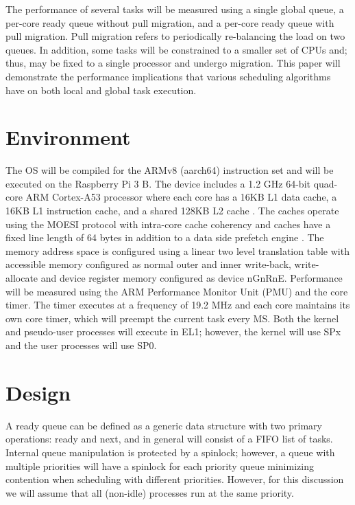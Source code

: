 \documentclass[11pt]{article}
\begin{document}
The performance of several tasks will be measured using a single global queue, a per-core ready queue without pull migration, and a per-core ready queue with pull migration.  Pull migration refers to periodically re-balancing the load on two queues.  In addition, some tasks will be constrained to a smaller set of CPUs and; thus, may be fixed to a single processor and undergo migration.  This paper will demonstrate the performance implications that various scheduling algorithms have on both local and global task execution.

\section{Environment}
\label{sec:environment}
The OS will be compiled for the ARMv8 (aarch64) instruction set and will be executed on the Raspberry Pi 3 B.  The device includes a 1.2 GHz 64-bit quad-core ARM Cortex-A53 processor where each core has a 16KB L1 data cache, a 16KB L1 instruction cache, and a shared 128KB L2 cache \cite{arm-l1-about} \cite{arm-l2-about}.  The caches operate using the MOESI protocol with intra-core cache coherency and caches have a fixed line length of 64 bytes in addition to a data side prefetch engine \cite{arm-l1-coherency} \cite{arm-l1-prefetch}.  The memory address space is configured using a linear two level translation table with accessible memory configured as normal outer and inner write-back, write-allocate and device register memory configured as device nGnRnE.  Performance will be measured using the ARM Performance Monitor Unit (PMU) and the core timer.  The timer executes at a frequency of 19.2 MHz \cite{bcm2386} and each core maintains its own core timer, which will preempt the current task every MS.  Both the kernel and pseudo-user processes will execute in EL1; however, the kernel will use SPx and the user processes will use SP0.

\section{Design}
\label{sec:design}
A ready queue can be defined as a generic data structure with two primary operations: ready and next, and in general will consist of a FIFO list of tasks.  Internal queue manipulation is protected by a spinlock; however, a queue with multiple priorities will have a spinlock for each priority queue minimizing contention when scheduling with different priorities.  However, for this discussion we will assume that all (non-idle) processes run at the same priority.
\end{document}
